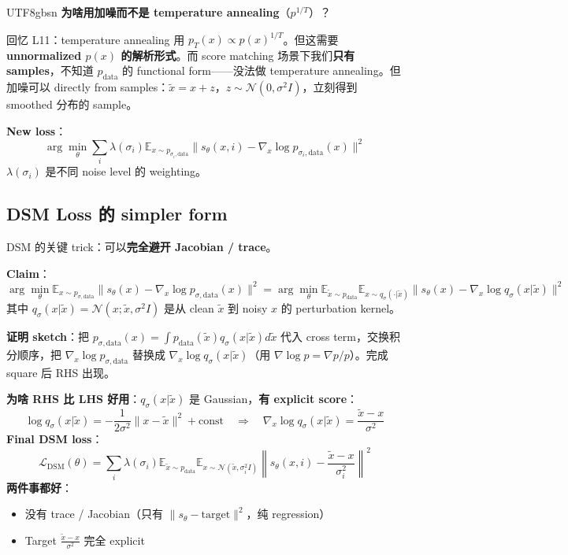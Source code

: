 \documentclass[11pt]{article}
\begin{document}
\begin{CJK}{UTF8}{gbsn}
\textbf{为啥用加噪而不是 temperature annealing}（$p^{1/T}$）？

回忆 L11：temperature annealing 用 $p_T(x) \propto p(x)^{1/T}$。但这需要 \textbf{unnormalized $p(x)$ 的解析形式}。而 score matching 场景下我们\textbf{只有 samples}，不知道 $p_{\text{data}}$ 的 functional form——没法做 temperature annealing。但加噪可以 directly from samples：$\tilde{x} = x + z$，$z \sim \mathcal{N}(0, \sigma^2 I)$，立刻得到 smoothed 分布的 sample。

\textbf{New loss}：
\[
\arg\min_\theta \sum_i \lambda(\sigma_i) \mathbb{E}_{x \sim p_{\sigma_i, \text{data}}} \|s_\theta(x, i) - \nabla_x \log p_{\sigma_i, \text{data}}(x)\|^2
\]
$\lambda(\sigma_i)$ 是不同 noise level 的 weighting。

\subsection{DSM Loss 的 simpler form}

DSM 的关键 trick：可以\textbf{完全避开 Jacobian / trace}。

\textbf{Claim}：
\[
\arg\min_\theta \mathbb{E}_{x \sim p_{\sigma, \text{data}}} \|s_\theta(x) - \nabla_x \log p_{\sigma, \text{data}}(x)\|^2 = \arg\min_\theta \mathbb{E}_{\tilde{x} \sim p_{\text{data}}} \mathbb{E}_{x \sim q_\sigma(\cdot|\tilde{x})} \|s_\theta(x) - \nabla_x \log q_\sigma(x|\tilde{x})\|^2
\]
其中 $q_\sigma(x|\tilde{x}) = \mathcal{N}(x; \tilde{x}, \sigma^2 I)$ 是从 clean $\tilde{x}$ 到 noisy $x$ 的 perturbation kernel。

\textbf{证明 sketch}：把 $p_{\sigma, \text{data}}(x) = \int p_{\text{data}}(\tilde{x}) q_\sigma(x | \tilde{x}) d\tilde{x}$ 代入 cross term，交换积分顺序，把 $\nabla_x \log p_{\sigma, \text{data}}$ 替换成 $\nabla_x \log q_\sigma(x | \tilde{x})$（用 $\nabla \log p = \nabla p / p$）。完成 square 后 RHS 出现。

\textbf{为啥 RHS 比 LHS 好用}：$q_\sigma(x | \tilde{x})$ 是 Gaussian，\textbf{有 explicit score}：
\[
\log q_\sigma(x | \tilde{x}) = -\frac{1}{2\sigma^2}\|x - \tilde{x}\|^2 + \text{const}
\quad\Rightarrow\quad
\nabla_x \log q_\sigma(x | \tilde{x}) = \frac{\tilde{x} - x}{\sigma^2}
\]
\textbf{Final DSM loss}：
\[
\boxed{\mathcal{L}_{\text{DSM}}(\theta) = \sum_i \lambda(\sigma_i) \mathbb{E}_{\tilde{x} \sim p_{\text{data}}} \mathbb{E}_{x \sim \mathcal{N}(\tilde{x}, \sigma_i^2 I)} \left\|s_\theta(x, i) - \frac{\tilde{x} - x}{\sigma_i^2}\right\|^2}
\]
\textbf{两件事都好}：
\begin{itemize}[nosep]
  \item 没有 trace / Jacobian（只有 $\|s_\theta - \text{target}\|^2$，纯 regression）
  \item Target $\frac{\tilde{x} - x}{\sigma^2}$ 完全 explicit
\end{itemize}


\end{CJK}
\end{document}
